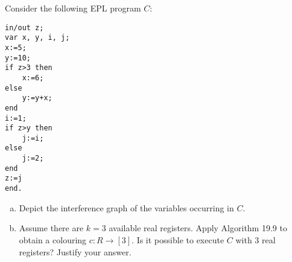 \begin{exercise}{6}
Consider the following EPL program $C$:
\begin{lstlisting}[numbers=none]
in/out z;
var x, y, i, j;
x:=5;
y:=10;
if z>3 then
	x:=6;
else 
	y:=y+x;
end
i:=1;
if z>y then
	j:=i;
else
	j:=2;
end
z:=j 
end.
\end{lstlisting}

\begin{enumerate}[(a)]
    \item Depict the interference graph of the variables occurring in $C$.
    \item Assume there are $k=3$ available real registers. Apply Algorithm 19.9 to obtain a colouring $c \colon R \to [3]$.
                Is it possible to execute $C$ with $3$ real registers? Justify your answer.
\end{enumerate}

\end{exercise}

